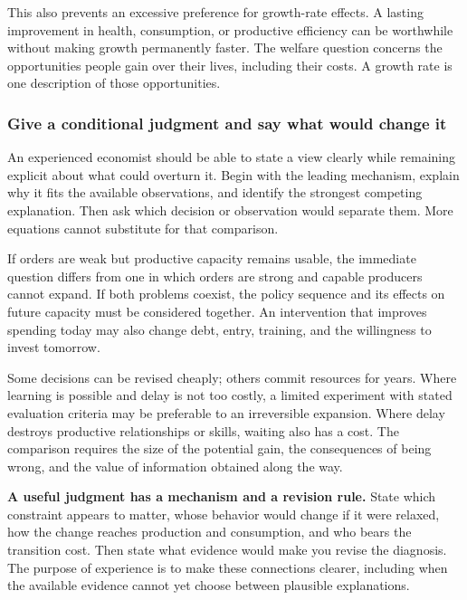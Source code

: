 This also prevents an excessive preference for growth-rate effects. A
lasting improvement in health, consumption, or productive efficiency can
be worthwhile without making growth permanently faster. The welfare
question concerns the opportunities people gain over their lives, including
their costs. A growth rate is one description of those opportunities.

\subsubsection{Give a conditional judgment and say what would change it}

An experienced economist should be able to state a view clearly while
remaining explicit about what could overturn it. Begin with the leading
mechanism, explain why it fits the available observations, and identify
the strongest competing explanation. Then ask which decision or observation
would separate them. More equations cannot substitute for that comparison.

If orders are weak but productive capacity remains usable, the immediate
question differs from one in which orders are strong and capable producers
cannot expand. If both problems coexist, the policy sequence and its
effects on future capacity must be considered together. An intervention
that improves spending today may also change debt, entry, training, and
the willingness to invest tomorrow.

Some decisions can be revised cheaply; others commit resources for years.
Where learning is possible and delay is not too costly, a limited experiment
with stated evaluation criteria may be preferable to an irreversible
expansion. Where delay destroys productive relationships or skills, waiting
also has a cost. The comparison requires the size of the potential gain,
the consequences of being wrong, and the value of information obtained
along the way.

\begin{greenblock}
\textbf{A useful judgment has a mechanism and a revision rule.}
State which constraint appears to matter, whose behavior would change if
it were relaxed, how the change reaches production and consumption, and who
bears the transition cost. Then state what evidence would make you revise
the diagnosis. The purpose of experience is to make these connections
clearer, including when the available evidence cannot yet choose between
plausible explanations.
\end{greenblock}

